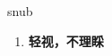 
\begin{frame}
{\huge snub}
\begin{center}
\begin{enumerate}\Large
  \item \textbf{轻视，不理睬}
\end{enumerate}
\end{center}
\end{frame}
